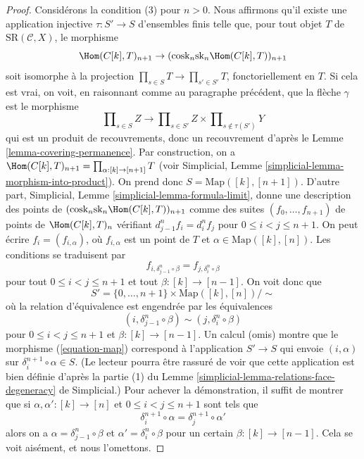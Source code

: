 \begin{proof}
\medskip\noindent
Considérons la condition (3) pour $n > 0$. Nous affirmons qu'il existe une
application injective $\tau : S' \to S$ d'ensembles finis telle que, pour tout
objet $T$ de $\text{SR}(\mathcal{C}, X)$, le morphisme
\begin{equation}
\label{equation-map}
\Hom(C[k], T)_{n + 1} \to
(\text{cosk}_n \text{sk}_n \Hom(C[k], T))_{n + 1}
\end{equation}
soit isomorphe à la projection $\prod_{s \in S} T \to \prod_{s' \in S'} T$,
fonctoriellement en $T$. Si cela est vrai, on voit, en raisonnant comme au
paragraphe précédent, que la flèche $\gamma$ est le morphisme
$$
\prod\nolimits_{s \in S} Z
\longrightarrow
\prod\nolimits_{s \in S'} Z
\times
\prod\nolimits_{s \not\in \tau(S')} Y
$$
qui est un produit de recouvrements, donc un recouvrement d'après le
Lemme \ref{lemma-covering-permanence}. Par construction, on a
$\Hom(C[k], T)_{n + 1} = \prod_{\alpha : [k] \to [n + 1]} T$
(voir Simplicial, Lemme \ref{simplicial-lemma-morphism-into-product}).
On prend donc $S = \text{Map}([k], [n + 1])$.
D'autre part, Simplicial, Lemme \ref{simplicial-lemma-formula-limit},
donne une description des points de
$(\text{cosk}_n \text{sk}_n \Hom(C[k], T))_{n + 1}$
comme des suites $(f_0, \ldots, f_{n + 1})$ de points de $\Hom(C[k], T)_n$
vérifiant $d^n_{j - 1} f_i = d^n_i f_j$ pour $0 \leq i < j \leq n + 1$.
On peut écrire $f_i = (f_{i, \alpha})$, où $f_{i, \alpha}$ est un point de $T$
et $\alpha \in \text{Map}([k], [n])$. Les conditions se traduisent par
$$
f_{i, \delta^n_{j - 1} \circ \beta} = f_{j, \delta_i^n \circ \beta}
$$
pour tout $0 \leq i < j \leq n + 1$ et tout $\beta : [k] \to [n - 1]$. On
voit donc que
$$
S' = \{0, \ldots, n + 1\} \times \text{Map}([k], [n]) / \sim
$$
où la relation d'équivalence est engendrée par les équivalences
$$
(i, \delta^n_{j - 1} \circ \beta) \sim (j, \delta_i^n \circ \beta)
$$
pour $0 \leq i < j \leq n + 1$ et $\beta : [k] \to [n - 1]$.
Un calcul (omis) montre que le morphisme (\ref{equation-map})
correspond à l'application $S' \to S$ qui envoie $(i, \alpha)$ sur
$\delta^{n + 1}_i \circ \alpha \in S$. (Le lecteur pourra être rassuré
de voir que cette application est bien définie d'après la partie (1) du
Lemme \ref{simplicial-lemma-relations-face-degeneracy} de Simplicial.)
Pour achever la démonstration, il suffit de montrer que si
$\alpha, \alpha' : [k] \to [n]$ et $0 \leq i < j \leq n + 1$
sont tels que
$$
\delta^{n + 1}_i \circ \alpha = \delta^{n + 1}_j \circ \alpha'
$$
alors on a $\alpha = \delta^n_{j - 1} \circ \beta$
et $\alpha' = \delta_i^n \circ \beta$ pour un certain $\beta : [k] \to [n - 1]$.
Cela se voit aisément, et nous l'omettons.
\end{proof}

